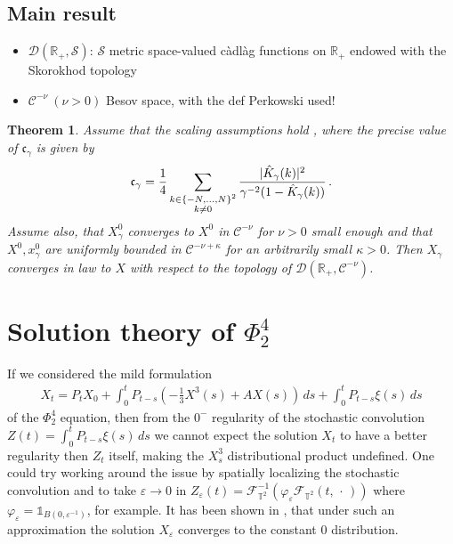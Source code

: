 \documentclass{report}
\newcommand{\RR}{\mathbb{R}}
\newcommand{\TT}{\mathbb{T}}
\DeclarePairedDelimiter\abs{\lvert}{\rvert} %
\newcommand{\CharFunction}[1]{\mathds{1}_{#1}}
\newcommand{\Placeholder}{\,\mathrel{\cdot}\,}
\newtheorem{theorem}{Theorem}[chapter]
\theoremstyle{remark}
\theoremstyle{definition}
\newcommand{\TODO}[1]{\text{\textcolor{red}{TODO: #1}}\xspace}
\let\phi\varphi
\let\epsilon\varepsilon
\begin{document}
\section{Main result}
  \begin{itemize}
    \item $\mathcal{D}(\mathbb{R}_+, \mathcal{S})$: $\mathcal{S}$ metric space-valued càdlàg functions on $\mathbb{R}_+$ endowed with the Skorokhod topology
    \item $\mathcal{C}^{-\nu}~(\nu > 0)$ Besov space, with the def Perkowski used!
  \end{itemize}

\begin{theorem}
  Assume that the scaling assumptions hold \TODO{which scaling assumptions?}, where the precise value of $\mathfrak{c}_\gamma$ is given by\begin{align}
    \mathfrak{c}_\gamma = \frac{1}{4}\sum_{\substack{k \in \left\{-N, \ldots, N\right\}^2\\k\neq 0}}\frac{\abs{\hat{K}_\gamma(k)}^2}{\gamma^{-2} (1 - \hat{K}_\gamma(k))}\,.
  \end{align}
  Assume also, that $X^0_\gamma$ converges to $X^0$ in $\mathcal{C}^{-\nu}$ for $\nu > 0$ small enough and that $X^0, x^0_\gamma$ are uniformly bounded in $\mathcal{C}^{-\nu + \kappa}$ for an arbitrarily small $\kappa > 0$. Then $X_\gamma$ converges in law to $X$ with respect to the topology of $\mathcal{D}(\RR_+, \mathcal{C}^{-\nu})$.
\end{theorem}
\TODO{rough sketch of the proof idea}
\chapter{Solution theory of $\Phi^4_2$}
If we considered the mild formulation 
\begin{align}
  X_t = P_t X_0 + \int_{0}^{t}P_{t-s}\left(-\frac{1}{3}X^3(s) + A X(s)\right)\,ds + \int_0^t P_{t-s} \xi(s) \,ds
\end{align}
of the $\Phi^4_2$ equation, then from the $0^-$ regularity of the stochastic convolution $Z(t) = \int_0^t P_{t-s} \xi(s) \,ds$ we cannot expect the solution $X_t$ to have a better regularity then $Z_t$ itself, making the $X^3_s$ distributional product undefined. One could try working around the issue by spatially localizing the stochastic convolution and to take $\epsilon \to 0$ in $Z_\epsilon(t) = \mathcal{F}_{\TT^2}^{-1}(\phi_\epsilon \mathcal{F}_{\TT^2}(t, \Placeholder))$ where $\phi_\epsilon = \CharFunction{B(0, \epsilon^{-1})}$, for example. It has been shown in \cite{hairer2012triviality}, that under such an approximation the solution $X_\epsilon$ converges to the constant $0$ distribution.
\end{document}
